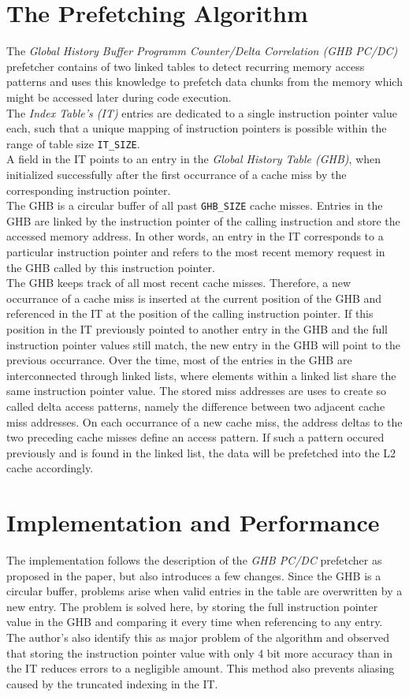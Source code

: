 \documentclass{article}
\begin{document}
\section{The Prefetching Algorithm}
The \textit{Global History Buffer Programm Counter/Delta Correlation (GHB PC/DC)} prefetcher contains of two linked tables to detect recurring memory access patterns and uses this knowledge to prefetch data chunks from the memory which might be accessed later during code execution. \\
The \textit{Index Table's (IT)} entries are dedicated to a single instruction pointer value each, such that a unique mapping of instruction pointers is possible within the range of table size \texttt{IT\_SIZE}. \\
A field in the IT points to an entry in the \textit{Global History Table (GHB)}, when initialized successfully after the first occurrance of a cache miss by the corresponding instruction pointer. \\
The GHB is a circular buffer of all past \texttt{GHB\_SIZE} cache misses. Entries in the GHB are linked by the instruction pointer of the calling instruction and store the accessed memory address.
In other words, an entry in the IT corresponds to a particular instruction pointer and refers to the most recent memory request in the GHB called by this instruction pointer. \\
The GHB keeps track of all most recent cache misses. Therefore, a new occurrance of a cache miss is inserted at the current position of the GHB and referenced in the IT at the position of the calling instruction pointer. If this position in the IT previously pointed to another entry in the GHB and the full instruction pointer values still match, the new entry in the GHB will point to the previous occurrance.
Over the time, most of the entries in the GHB are interconnected through linked lists, where elements within a linked list share the same instruction pointer value. The stored miss addresses are uses to create so called delta access patterns, namely the difference between two adjacent cache miss addresses. On each occurrance of a new cache miss, the address deltas to the two preceding cache misses define an access pattern. If such a pattern occured previously and is found in the linked list, the data will be prefetched into the L2 cache accordingly.


\section{Implementation and Performance}
The implementation follows the description of the \textit{GHB PC/DC} prefetcher as proposed in the paper, but also introduces a few changes.
Since the GHB is a circular buffer, problems arise when valid entries in the table are overwritten by a new entry. 
The problem is solved here, by storing the full instruction pointer value in the GHB and comparing it every time when referencing to any entry. 
The author's also identify this as major problem of the algorithm and observed that storing the instruction pointer value with only 4 bit more accuracy than in the IT reduces errors to a negligible amount.
This method also prevents aliasing caused by the truncated indexing in the IT.
\end{document}
